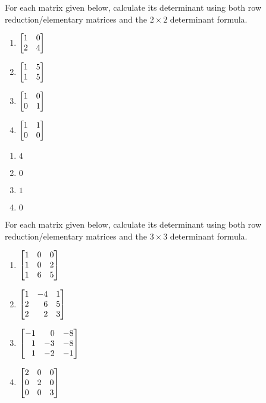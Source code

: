 \begin{exercises}
	\begin{problist}
		\prob For each matrix given below, calculate its determinant
		using both row reduction/elementary matrices and the $2\times 2$ determinant formula.
		\begin{enumerate}
			\item $\mat{1 & 0 \\ 2 & 4}$

			\item $\mat{1 & 5 \\ 1 & 5}$

			\item $\mat{1 & 0 \\ 0 & 1}$

			\item $\mat{1 & 1 \\ 0 & 0}$
		\end{enumerate}
        \begin{solution}
        \begin{enumerate}
            \item $4$
            \item $0$
            \item $1$
            \item $0$
        \end{enumerate}
        \end{solution}
		\prob For each matrix given below, calculate its determinant
		using both row reduction/elementary matrices and the $3\times 3$ determinant formula.
		\begin{enumerate}
			\item $\mat{1 & 0 & 0 \\ 1 & 0 & 2 \\ 1 & 6 & 5}$

			\item $\mat{1 & -4 & 1 \\ 2 & 6 & 5 \\ 2 & 2 & 3}$

			\item $\mat{-1 & 0 & -8 \\ 1 & -3 & -8 \\ 1 & -2 & -1}$

			\item $\mat{2 & 0 & 0 \\ 0 & 2 & 0 \\ 0 & 0 & 3}$


\end{enumerate}
\end{problist}
\end{exercises}
